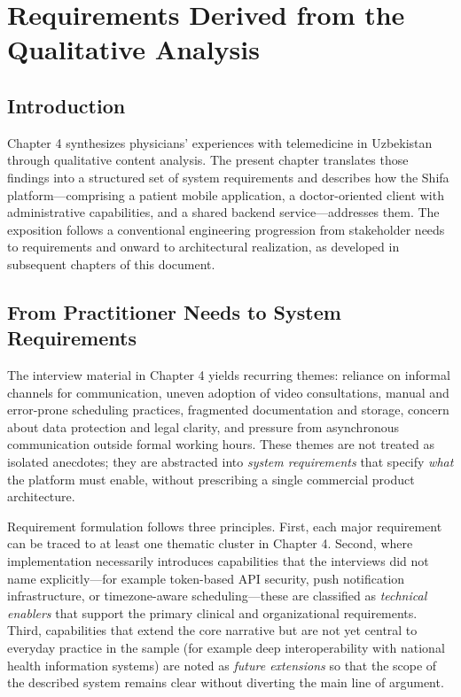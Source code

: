 \chapter{Requirements Derived from the Qualitative Analysis}
\label{ch:requirements-derived}

\section{Introduction}

Chapter 4 synthesizes physicians' experiences with telemedicine in Uzbekistan through qualitative content analysis. The present chapter translates those findings into a structured set of system requirements and describes how the Shifa platform---comprising a patient mobile application, a doctor-oriented client with administrative capabilities, and a shared backend service---addresses them. The exposition follows a conventional engineering progression from stakeholder needs to requirements and onward to architectural realization, as developed in subsequent chapters of this document.

\section{From Practitioner Needs to System Requirements}

The interview material in Chapter 4 yields recurring themes: reliance on informal channels for communication, uneven adoption of video consultations, manual and error-prone scheduling practices, fragmented documentation and storage, concern about data protection and legal clarity, and pressure from asynchronous communication outside formal working hours. These themes are not treated as isolated anecdotes; they are abstracted into \emph{system requirements} that specify \emph{what} the platform must enable, without prescribing a single commercial product architecture.

Requirement formulation follows three principles. First, each major requirement can be traced to at least one thematic cluster in Chapter 4. Second, where implementation necessarily introduces capabilities that the interviews did not name explicitly---for example token-based API security, push notification infrastructure, or timezone-aware scheduling---these are classified as \emph{technical enablers} that support the primary clinical and organizational requirements. Third, capabilities that extend the core narrative but are not yet central to everyday practice in the sample (for example deep interoperability with national health information systems) are noted as \emph{future extensions} so that the scope of the described system remains clear without diverting the main line of argument.

